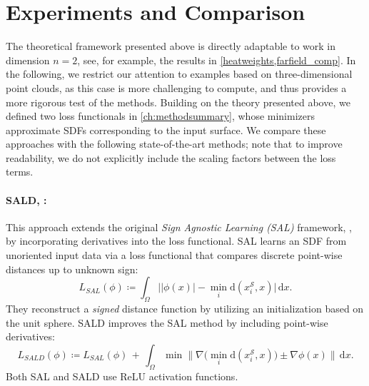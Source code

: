 \documentclass[12pt,openany]{book}
\def\S{\mathcal{S}}
\theoremstyle{plainnormal}
\theoremstyle{remark}
\begin{document}
\section{Experiments and Comparison}\label{Comps}
The theoretical framework presented above is directly adaptable to work in dimension $n=2$, see, for example, the results in \cref{heatweights,farfield_comp}. In the following, we restrict our attention to examples based on three-dimensional point clouds, as this case is more challenging to compute, and thus provides a more rigorous test of the methods. Building on the theory presented above, we defined two loss functionals in \cref{ch:methodsummary}, whose minimizers approximate SDFs corresponding to the input surface. We compare these approaches with the following state-of-the-art methods; note that to improve readability, we do not explicitly include the scaling factors between the loss terms.
\paragraph{SALD, \cite{SALD}:} This approach extends the original \emph{Sign Agnostic Learning (SAL)} framework, \cite{SAL}, by incorporating derivatives into the loss functional. SAL learns an SDF from unoriented input data via a loss functional that compares discrete point-wise distances up to unknown sign:
$$L_{SAL}(\phi) \coloneqq \int_\Omega\big||\phi(x)| - \min_{i} \mathrm{d}( x_i^\S, x)\big|\,\mathrm{d}x.
$$
They reconstruct a \emph{signed} distance function by utilizing an initialization based on the unit sphere.
SALD improves the SAL method by including point-wise derivatives:
$$L_{SALD}(\phi) \coloneqq L_{SAL}(\phi)\, +\, \int_\Omega \min \|\nabla\big(\min_{i} \mathrm{d}( x_i^\S, x)\big) \pm \nabla \phi(x)\|  \,\mathrm{d}x.$$
Both SAL and SALD use ReLU activation functions.
\end{document}
